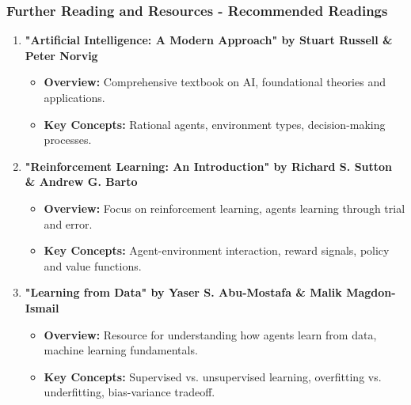 \documentclass[aspectratio=169]{beamer}
\begin{document}
\begin{frame}[fragile]
  \frametitle{Further Reading and Resources - Recommended Readings}
  
  \begin{enumerate}
    \item \textbf{"Artificial Intelligence: A Modern Approach" by Stuart Russell \& Peter Norvig}
      \begin{itemize}
        \item \textbf{Overview:} Comprehensive textbook on AI, foundational theories and applications.
        \item \textbf{Key Concepts:} Rational agents, environment types, decision-making processes.
      \end{itemize}
      
    \item \textbf{"Reinforcement Learning: An Introduction" by Richard S. Sutton \& Andrew G. Barto}
      \begin{itemize}
        \item \textbf{Overview:} Focus on reinforcement learning, agents learning through trial and error.
        \item \textbf{Key Concepts:} Agent-environment interaction, reward signals, policy and value functions.
      \end{itemize}
    
    \item \textbf{"Learning from Data" by Yaser S. Abu-Mostafa \& Malik Magdon-Ismail}
      \begin{itemize}
        \item \textbf{Overview:} Resource for understanding how agents learn from data, machine learning fundamentals.
        \item \textbf{Key Concepts:} Supervised vs. unsupervised learning, overfitting vs. underfitting, bias-variance tradeoff.
      \end{itemize}
  \end{enumerate}
\end{frame}
\end{document}
